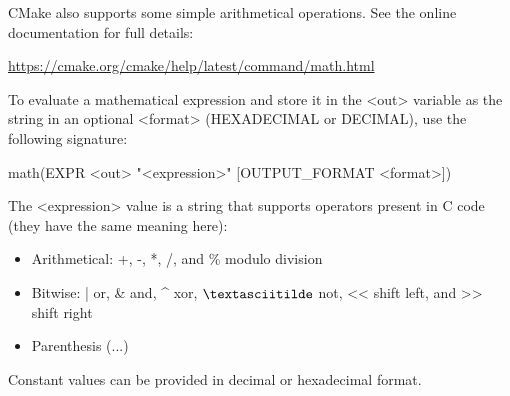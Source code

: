 CMake also supports some simple arithmetical operations. See the online documentation for full details:

\url{https://cmake.org/cmake/help/latest/command/math.html}

To evaluate a mathematical expression and store it in the <out> variable as the string in an optional <format> (HEXADECIMAL or DECIMAL), use the following signature:

\begin{cmake}
math(EXPR <out> "<expression>" [OUTPUT_FORMAT <format>])
\end{cmake}

The <expression> value is a string that supports operators present in C code (they have the same meaning here):

\begin{itemize}
\item
Arithmetical: +, -, *, /, and \% modulo division

\item
Bitwise: | or, \& and, \^{} xor, $\textasciitilde$ not, <{}< shift left, and >{}> shift right

\item
Parenthesis (...)
\end{itemize}

Constant values can be provided in decimal or hexadecimal format.


